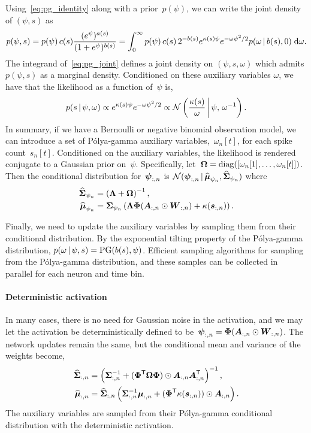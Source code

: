 Using~\eqref{eq:pg_identity} along with a prior~$p(\psi)$, we can write the joint density of $(\psi, s)$ as
\begin{equation}
  \label{eq:pg_joint}
  p(\psi, s) = p(\psi) \, c(s) \frac{(e^\psi)^{a(s)}}{(1+e^\psi)^{b(s)}} = \int_0^\infty
  p(\psi) \, c(s) \, 2^{-b(s)} e^{\kappa(s) \psi} e^{-\omega \psi^2/2} p(\omega \,|\, b(s), 0) \; \mathrm{d}\omega.
\end{equation}
The integrand of~\eqref{eq:pg_joint} defines a joint density on $(\psi, s,
\omega)$ which admits $p(\psi, s)$ as a marginal density.
Conditioned on these auxiliary variables $\omega$, we have that the likelihood as a function of~$\psi$ is,
\begin{equation}
  p(s \,|\, \psi, \omega) \propto e^{\kappa(s) \psi} e^{- \omega \psi^2/2} 
\propto \mathcal{N} \left(\frac{\kappa(s)}{\omega} \, \bigg| \, \psi, \, \omega^{-1} \right).
\end{equation}
In summary, if we have a Bernoulli or negative binomial observation model, we can introduce a set of P\'{o}lya-gamma auxiliary variables,~$\omega_n[t]$, for each spike count~$s_n[t]$. Conditioned on the auxiliary variables, the likelihood is rendered conjugate to a Gaussian prior on~$\psi$. Specifically, let~$\boldsymbol{\Omega} = \mathrm{diag}([\omega_{n}[1], \ldots, \omega_n[t]])$. Then the conditional distribution for~$\boldsymbol{\psi}_{:,n}$ is 
$\mathcal{N}(\boldsymbol{\psi}_{:,n} \,|\, \widehat{\boldsymbol{\mu}}_{\psi_n}, \widehat{\boldsymbol{\Sigma}}_{\psi_n})$
where
\begin{align}
\widehat{\boldsymbol{\Sigma}}_{\psi_n} &= \left( \boldsymbol{\Lambda} + \boldsymbol{\Omega} \right)^{-1},
\\
\widehat{\boldsymbol{\mu}}_{\psi_n} &= \boldsymbol{\Sigma}_{\psi_{n}} \left(\boldsymbol{\Lambda} \boldsymbol{\Phi} (\boldsymbol{A}_{:,n} \odot \boldsymbol{W}_{:,n}) + \kappa(\boldsymbol{s}_{:,n}) \right).
\end{align}


Finally, we need to update the auxiliary variables by sampling them from their conditional distribution. 
By the exponential tilting property of the P\'{o}lya-gamma
distribution, ${p(\omega \,|\, \psi, s) = \mathrm{PG}(b(s), \psi)}$.
Efficient sampling algorithms for sampling from the P\'{o}lya-gamma distribution, and 
these samples can be collected in parallel for each neuron and time bin. 

\paragraph{Deterministic activation}
In many cases, there is no need for Gaussian noise in the activation, and we may let the activation be deterministically defined to be~$\boldsymbol{\psi}_{:,n} = \boldsymbol{\Phi}(\boldsymbol{A}_{:,n} \odot \boldsymbol{W}_{:,n})$. The network updates remain the same, but the conditional mean and variance of the weights become,
\begin{align}
\widehat{\boldsymbol{\Sigma}}_{:,n} &= \left( \boldsymbol{\Sigma}_{:,n}^{-1} + (\boldsymbol{\Phi}^{\mathsf{T}} \boldsymbol{\Omega} \boldsymbol{\Phi}) \odot \boldsymbol{A}_{:,n} \boldsymbol{A}_{:,n}^{\mathsf{T}} \right)^{-1}, \\
\widehat{\boldsymbol{\mu}}_{:,n} &= \widehat{\boldsymbol{\Sigma}}_{:,n}
\left( \boldsymbol{\Sigma}_{:,n}^{-1} \boldsymbol{\mu}_{:,n} + (\boldsymbol{\Phi}^{\mathsf{T}}  \kappa(\boldsymbol{s}_{:,n})) \odot \boldsymbol{A}_{:,n} \right).
\end{align}
The auxiliary variables are sampled from their P\'{o}lya-gamma conditional distribution with the deterministic activation.

